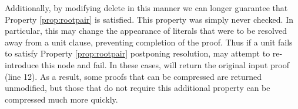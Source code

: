 Additionally, by modifying delete in this manner we can longer guarantee that Property \ref{prop:rootpair} is satisfied. This property was simply never checked. In particular, this may change the appearance of literals that were to be resolved away from a unit clause, preventing completion of the proof. Thus if a unit fails to satisfy Property \ref{prop:rootpair} postponing resolution, {\SFOLowerUnits} may attempt to re-introduce this node and fail. In these cases, \SFOLowerUnits will return the original input proof (line 12). As a result, some proofs that can be compressed are returned unmodified, but those that do not require this additional property can be compressed much more quickly.



%


